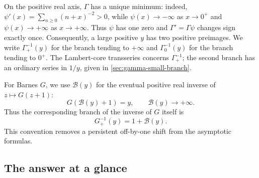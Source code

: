 \documentclass[11pt,oneside]{article}
\theoremstyle{plain}
\theoremstyle{definition}
\theoremstyle{remark}
\newcommand{\Bcal}{\mathcal{B}}
\begin{document}
On the positive real axis, \(\Gamma\) has a unique minimum: indeed,
\(\psi'(x)=\sum_{n\ge0}(n+x)^{-2}>0\), while
\(\psi(x)\to-\infty\) as \(x\to0^+\) and
\(\psi(x)\to+\infty\) as \(x\to+\infty\).  Thus \(\psi\) has one
zero and \(\Gamma'=\Gamma\psi\) changes sign exactly once.  Consequently,
a large positive \(y\) has two positive preimages.  We write
\(\Gamma_+^{-1}(y)\) for the branch tending to \(+\infty\) and
\(\Gamma_0^{-1}(y)\) for the branch tending to \(0^+\).  The Lambert-core
transseries concerns \(\Gamma_+^{-1}\); the second branch has an ordinary
series in \(1/y\), given in \cref{sec:gamma-small-branch}.

For Barnes \(G\), we use \(\Bcal(y)\) for the eventual positive real inverse of
\(z\mapsto G(z+1)\):
\[
 G(\Bcal(y)+1)=y,\qquad \Bcal(y)\longrightarrow+\infty.
\]
Thus the corresponding branch of the inverse of \(G\) itself is
\[
 G_+^{-1}(y)=1+\Bcal(y).
\]
This convention removes a persistent off-by-one shift from the asymptotic
formulas.

\subsection{The answer at a glance}
\end{document}
